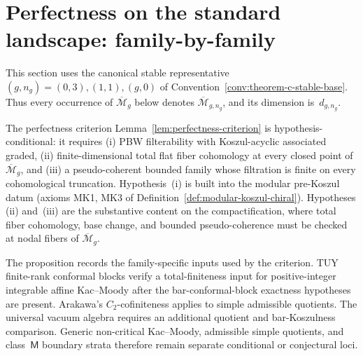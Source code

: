 \section{Perfectness on the standard landscape: family-by-family}
\label{sec:perfectness-standard-landscape}

This section uses the canonical stable representative
\((g,n_g)=(0,3),(1,1),(g,0)\) of
Convention~\ref{conv:theorem-c-stable-base}.  Thus every occurrence
of \(\overline{\mathcal M}_g\) below denotes
\(\overline{\mathcal M}_{g,n_g}\), and its dimension is~\(d_{g,n_g}\).

The perfectness criterion
Lemma~\ref{lem:perfectness-criterion} is hypothesis-conditional: it
requires \textup{(i)} PBW filterability with Koszul-acyclic
associated graded, \textup{(ii)} finite-dimensional total flat fiber
cohomology at every closed point of $\overline{\mathcal{M}}_g$, and
\textup{(iii)} a pseudo-coherent bounded family whose filtration is
finite on every cohomological truncation.
Hypothesis~\textup{(i)} is built into the modular pre-Koszul datum
(axioms \textup{MK1}, \textup{MK3} of
Definition~\ref{def:modular-koszul-chiral}). Hypotheses
\textup{(ii)} and~\textup{(iii)} are the substantive content on the
compactification, where total fiber cohomology, base change, and
bounded pseudo-coherence must be checked at nodal fibers of
$\overline{\mathcal{M}}_g$.

The proposition records the family-specific inputs used by the
criterion. TUY finite-rank conformal blocks verify a
total-finiteness input for positive-integer integrable affine
Kac--Moody after the bar-conformal-block exactness hypotheses are
present. Arakawa's
$C_2$-cofiniteness applies to simple admissible quotients. The
universal vacuum algebra requires an additional quotient and
bar-Koszulness comparison. Generic non-critical Kac--Moody,
admissible simple quotients, and class~$\mathsf{M}$ boundary strata
therefore remain separate conditional or conjectural loci.

